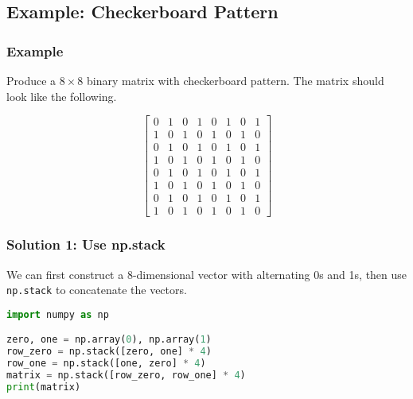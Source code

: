 \documentclass[beamer, en, version=2.0]{huangfusl-template}
\begin{document}
    \subsection{Example: Checkerboard Pattern}
    \begin{frame}
        \frametitle{Example}

        Produce a $8\times 8$ binary matrix with checkerboard pattern. The matrix should look like the following.

        \begin{equation*}
            \begin{bmatrix}
                0 & 1 & 0 & 1 & 0 & 1 & 0 & 1 \\
                1 & 0 & 1 & 0 & 1 & 0 & 1 & 0 \\
                0 & 1 & 0 & 1 & 0 & 1 & 0 & 1 \\
                1 & 0 & 1 & 0 & 1 & 0 & 1 & 0 \\
                0 & 1 & 0 & 1 & 0 & 1 & 0 & 1 \\
                1 & 0 & 1 & 0 & 1 & 0 & 1 & 0 \\
                0 & 1 & 0 & 1 & 0 & 1 & 0 & 1 \\
                1 & 0 & 1 & 0 & 1 & 0 & 1 & 0
            \end{bmatrix}
        \end{equation*}
    \end{frame}
    \begin{frame}[fragile]
        \frametitle{Solution 1: Use {\normalsize\ttfamily np.stack}}

        We can first construct a 8-dimensional vector with alternating 0s and 1s, then use {\color{blue}\footnotesize\verb|np.stack|} to concatenate the vectors.

\begin{lstlisting}[language=python]
import numpy as np

zero, one = np.array(0), np.array(1)
row_zero = np.stack([zero, one] * 4)
row_one = np.stack([one, zero] * 4)
matrix = np.stack([row_zero, row_one] * 4)
print(matrix)
\end{lstlisting}

    \end{frame}
\end{document}
